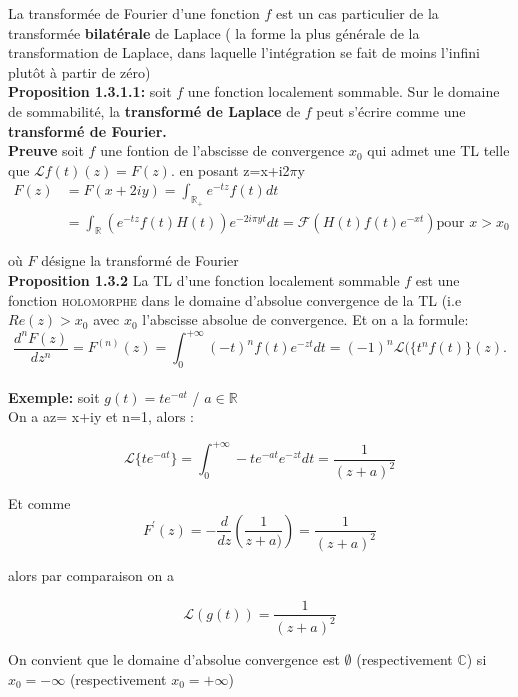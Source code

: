 \documentclass[12pt,a4paper]{report}
\begin{document}
La transformée de Fourier d'une fonction $\mathit{f}$ est un cas particulier de la transformée \textbf{bilatérale} de Laplace ( la forme la plus générale de la transformation de Laplace, dans laquelle l'intégration se fait de moins l'infini plut\^ot à partir de zéro)\\

\textbf{Proposition 1.3.1.1:} soit $f$ une fonction localement sommable. Sur le domaine de sommabilité, la \textbf{transformé de Laplace} de $f$ peut s'écrire comme une \textbf{transformé de Fourier.}\\

\textbf{Preuve} soit $f$ une fontion de l'abscisse de convergence $x_0$  qui admet une TL telle que $\mathcal{L}{{f(t)}}(z)= F(z)$.
en posant z=x+i2$\pi$y
\begin{align*}
F(z) &= F(x+2iy)= \int_{\mathbb{R}_{+}} e^{-tz} f(t) \mathit{dt}\\
 &=  \int_{\mathbb{R}} (e^{-tz} f(t) H(t))e^{-2i \pi yt} \mathit{dt} = \mathcal{F}(H(t)f(t) e^{-xt}) \text{pour $x>x_0$}
\end{align*}
   
où $\mathit{F}$ désigne la transformé de Fourier\\

\textbf{Proposition 1.3.2} La TL d'une fonction localement sommable $f$ est une fonction \textsc{holomorphe} dans le domaine d'absolue convergence de la TL (i.e $Re(z)>x_0$ avec $x_0$ l'abscisse absolue de convergence. Et on a la formule:
\begin{displaymath}
 \frac{d^{n}F(z)}{dz^{n}} = F^{(n)}(z)=\int_{0}^{+\infty} (-t)^{n}f(t) e^{-zt} dt = (-1)^{n} \mathcal{L} (\lbrace t^{n} f(t)\rbrace (z).
\end{displaymath}\\

\textbf{Exemple:} soit $g(t)= te^{-at}$ / $a \in \mathbb{R}$\\
On a az= x+iy et n=1, alors :

\[\mathcal{L} \lbrace te^{-at} \rbrace= \int_{0}^{+ \infty} -t e^{-at}  e^{-zt} dt =\frac{1}{(z+a)^{2}} \] 

Et comme \\

\[F^{'}(z)= -\frac{d}{dz} \left(\frac{1}{z+a)} \right)=\frac{1}{(z+a)^{2}}\] 

alors par comparaison on a

\[\mathcal{L}(g(t)) =\frac{1}{(z+a)^2} \]

On convient que le domaine d'absolue convergence est $\emptyset$ (respectivement $\mathbb{C}$) si $x_0=-\infty$ (respectivement $x_0=+\infty$)\\
\end{document}
